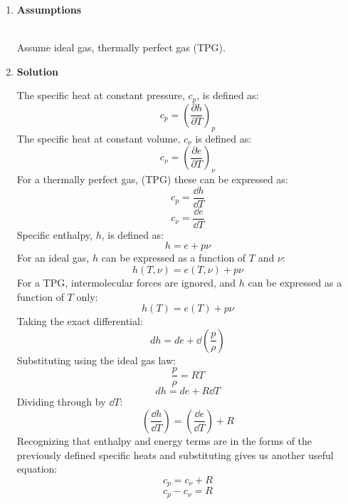 \documentclass[12pt,letterpaper]{article}
\begin{document}
\begin{enumerate}[label=(\alph*)]
\begin{enumerate}[label=\arabic*.]
			\item{\textbf{Assumptions}}
			\\
			Assume ideal gas, thermally perfect gas (TPG).
			\item{\textbf{Solution}}\\
			The specific heat at constant pressure, $c_p$, is defined as:
			\begin{equation*}
				c_p = \left(\frac{\partial h}{\partial T}\right)_p
			\end{equation*}
			The specific heat at constant volume, $c_{\nu}$ is defined as:
			\begin{equation*}
				c_{\nu} = \left(\frac{\partial e}{\partial T}\right)_{\nu}
			\end{equation*}		
			For a thermally perfect gas, (TPG) these can be expressed as:
			\begin{equation*}
				c_p = \frac{\dd h}{\dd T}
			\end{equation*}	
			\begin{equation*}
				c_{\nu} = \frac{\dd e}{\dd T}
			\end{equation*}	
			Specific enthalpy, $h$, is defined as:
			\begin{equation*}
				h = e + p\nu
			\end{equation*}
			For an ideal gas, $h$ can be expressed as a function of $T$ and $\nu$:
			\begin{equation*}
				h(T,\nu) = e(T,\nu) + p\nu
			\end{equation*}
			For a TPG, intermolecular forces are ignored, and $h$ can be expressed as a function of $T$ only:
			\begin{equation*}
				h(T) = e(T) + p\nu
			\end{equation*}
			Taking the exact differential:
			\begin{equation*}
				dh = de + \dd (\frac{p}{\rho})
			\end{equation*}
			Substituting using the ideal gas law:
			\begin{equation*}
				\frac{p}{\rho} = RT
			\end{equation*}
			\begin{equation*}
				dh = de + R\dd T
			\end{equation*}
			Dividing through by $\dd T$:
			\begin{equation*}
				\left(\frac{\dd h}{\dd T}\right) = \left(\frac{\dd e}{\dd T}\right) + R
			\end{equation*}
			Recognizing that enthalpy and energy terms are in the forms of the previously defined specific heats and substituting gives us another useful equation:
			\begin{equation*}
				c_p = c_{\nu} + R
			\end{equation*}
			\begin{equation*}
				\boxed{c_p - c_{\nu} = R}
			\end{equation*}
		

\end{enumerate}
\end{enumerate}
\end{document}
